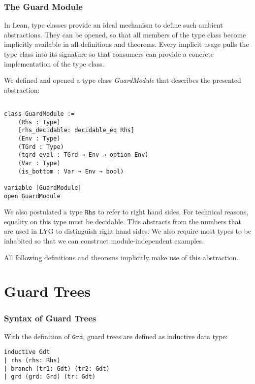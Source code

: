 \bigskip

\subsubsection{The Guard Module}

In Lean, type classes provide an ideal mechanism to define such ambient abstractions.
They can be opened, so that all members of the type class become implicitly available in all definitions and theorems.
Every implicit usage pulls the type class into its signature so that consumers can provide a concrete implementation of the type class.

We defined and opened a type class \textit{GuardModule} that describes the presented abstraction:

\begin{verbatim}

class GuardModule :=
    (Rhs : Type)
    [rhs_decidable: decidable_eq Rhs]
    (Env : Type)
    (TGrd : Type)
    (tgrd_eval : TGrd → Env → option Env)
    (Var : Type)
    (is_bottom : Var → Env → bool)

variable [GuardModule]
open GuardModule
\end{verbatim}

We also postulated a type $\mathtt{Rhs}$ to refer to right hand sides. For technical reasons, equality on this type must be decidable.
This abstracts from the numbers that are used in LYG to distinguish right hand sides.
We also require most types to be inhabited so that we can construct module-independent examples.

All following definitions and theorems implicitly make use of this abstraction.

\section{Guard Trees}\label{chap:formalGuardTrees}

\subsubsection{Syntax of Guard Trees}

With the definition of $\mathtt{Grd}$, guard trees are defined as inductive data type:

\begin{verbatim}
inductive Gdt
| rhs (rhs: Rhs)
| branch (tr1: Gdt) (tr2: Gdt)
| grd (grd: Grd) (tr: Gdt)
\end{verbatim}

